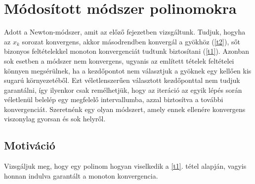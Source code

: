 \documentclass[a4paper,12pt]{report}
\begin{document}










%
%












\chapter{Módosított módszer polinomokra}
		Adott a Newton-módszer, amit az előző fejezetben vizsgáltunk. Tudjuk, hogyha az $x_k$ sorozat konvergens, akkor másodrendben konvergál a gyökhöz (\ref{t2}), sőt bizonyos feltételekkel monoton konvergenciát tudtunk biztosítani (\ref{t1}). Azonban sok esetben a módszer nem konvergens, ugyanis az említett tételek feltételei könnyen megsérülnek, ha a kezdőpontot nem választjuk a gyöknek egy kellően kis sugarú környezetéből. Ezt véletlenszerűen választott kezdőponttal nem tudjuk garantálni, így ilyenkor csak remélhetjük, hogy az iteráció az egyik lépés során véletlenül belelép egy megfelelő intervallumba, azzal biztosítva a további konvergenciát. Szeretnénk egy olyan módszert, amely ennek ellenére konvergens viszonylag gyorsan és sok helyről.































		\section{Motiváció}
			Vizsgáljuk meg, hogy egy polinom hogyan viselkedik a \ref{t1}. tétel alapján, vagyis honnan indulva garantált a monoton konvergencia.
\end{document}
